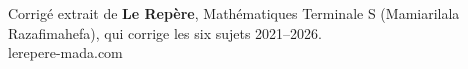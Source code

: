 \documentclass[11pt,a5paper,oneside,openany]{book}
\begin{document}
\small



\vfill
\begin{center}
	\footnotesize\color{gray}
	Corrigé extrait de \textbf{Le Repère}, Mathématiques Terminale S
	(Mamiarilala Razafimahefa), qui corrige les six sujets 2021--2026.\\
	lerepere-mada.com
\end{center}
\end{document}
